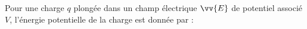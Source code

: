 ﻿\documentclass[a4paper]{article}
\begin{document}
\pagestyle{fancy}
\fancyhf{}
\setlength{\headheight}{15pt}

\begin{center}
	\large{}
\end{center}


Pour une charge \(q\) plongée dans un champ électrique \(\vv{E}\) de potentiel associé \(V\), l'énergie potentielle de la charge est donnée par :
\begin{center}
\end{center}
\end{document}
